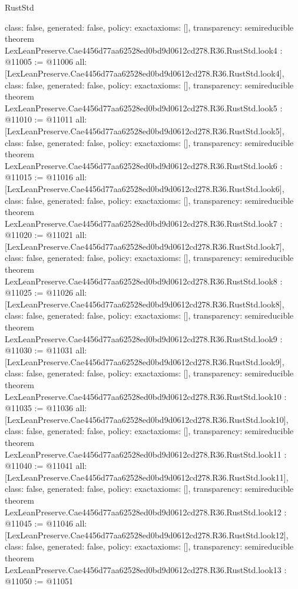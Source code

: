 \begin{lexlean}{RustStd}
\begin{coremodule}
{  class: false,
  generated: false,
  policy: exact{axioms: []},
  transparency: semireducible
}
theorem LexLeanPreserve.Cae4456d77aa62528ed0bd9d0612cd278.R36.RustStd.look4 : @11005 := @11006 {
  all: [LexLeanPreserve.Cae4456d77aa62528ed0bd9d0612cd278.R36.RustStd.look4],
  class: false,
  generated: false,
  policy: exact{axioms: []},
  transparency: semireducible
}
theorem LexLeanPreserve.Cae4456d77aa62528ed0bd9d0612cd278.R36.RustStd.look5 : @11010 := @11011 {
  all: [LexLeanPreserve.Cae4456d77aa62528ed0bd9d0612cd278.R36.RustStd.look5],
  class: false,
  generated: false,
  policy: exact{axioms: []},
  transparency: semireducible
}
theorem LexLeanPreserve.Cae4456d77aa62528ed0bd9d0612cd278.R36.RustStd.look6 : @11015 := @11016 {
  all: [LexLeanPreserve.Cae4456d77aa62528ed0bd9d0612cd278.R36.RustStd.look6],
  class: false,
  generated: false,
  policy: exact{axioms: []},
  transparency: semireducible
}
theorem LexLeanPreserve.Cae4456d77aa62528ed0bd9d0612cd278.R36.RustStd.look7 : @11020 := @11021 {
  all: [LexLeanPreserve.Cae4456d77aa62528ed0bd9d0612cd278.R36.RustStd.look7],
  class: false,
  generated: false,
  policy: exact{axioms: []},
  transparency: semireducible
}
theorem LexLeanPreserve.Cae4456d77aa62528ed0bd9d0612cd278.R36.RustStd.look8 : @11025 := @11026 {
  all: [LexLeanPreserve.Cae4456d77aa62528ed0bd9d0612cd278.R36.RustStd.look8],
  class: false,
  generated: false,
  policy: exact{axioms: []},
  transparency: semireducible
}
theorem LexLeanPreserve.Cae4456d77aa62528ed0bd9d0612cd278.R36.RustStd.look9 : @11030 := @11031 {
  all: [LexLeanPreserve.Cae4456d77aa62528ed0bd9d0612cd278.R36.RustStd.look9],
  class: false,
  generated: false,
  policy: exact{axioms: []},
  transparency: semireducible
}
theorem LexLeanPreserve.Cae4456d77aa62528ed0bd9d0612cd278.R36.RustStd.look10 : @11035 := @11036 {
  all: [LexLeanPreserve.Cae4456d77aa62528ed0bd9d0612cd278.R36.RustStd.look10],
  class: false,
  generated: false,
  policy: exact{axioms: []},
  transparency: semireducible
}
theorem LexLeanPreserve.Cae4456d77aa62528ed0bd9d0612cd278.R36.RustStd.look11 : @11040 := @11041 {
  all: [LexLeanPreserve.Cae4456d77aa62528ed0bd9d0612cd278.R36.RustStd.look11],
  class: false,
  generated: false,
  policy: exact{axioms: []},
  transparency: semireducible
}
theorem LexLeanPreserve.Cae4456d77aa62528ed0bd9d0612cd278.R36.RustStd.look12 : @11045 := @11046 {
  all: [LexLeanPreserve.Cae4456d77aa62528ed0bd9d0612cd278.R36.RustStd.look12],
  class: false,
  generated: false,
  policy: exact{axioms: []},
  transparency: semireducible
}
theorem LexLeanPreserve.Cae4456d77aa62528ed0bd9d0612cd278.R36.RustStd.look13 : @11050 := @11051 {
}
\end{coremodule}
\end{lexlean}
